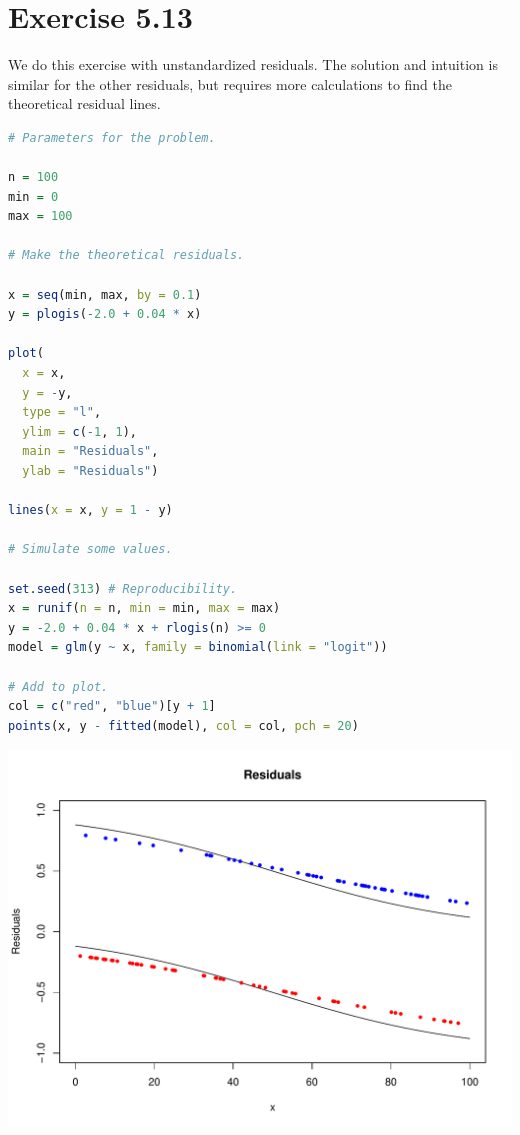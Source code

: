 \section*{Exercise 5.13}
We do this exercise with unstandardized residuals. The solution and intuition is similar for the other residuals, but requires more calculations to find the theoretical residual lines.
\begin{lstlisting}[language=R]
# Parameters for the problem.

n = 100
min = 0
max = 100

# Make the theoretical residuals.

x = seq(min, max, by = 0.1)
y = plogis(-2.0 + 0.04 * x)

plot(
  x = x, 
  y = -y, 
  type = "l", 
  ylim = c(-1, 1), 
  main = "Residuals",
  ylab = "Residuals")

lines(x = x, y = 1 - y)

# Simulate some values.

set.seed(313) # Reproducibility.
x = runif(n = n, min = min, max = max)
y = -2.0 + 0.04 * x + rlogis(n) >= 0
model = glm(y ~ x, family = binomial(link = "logit"))

# Add to plot.
col = c("red", "blue")[y + 1]
points(x, y - fitted(model), col = col, pch = 20)
\end{lstlisting}

\begin{center}
\includegraphics[scale=0.7]{figures/exercise-5.13.pdf}
\end{center}